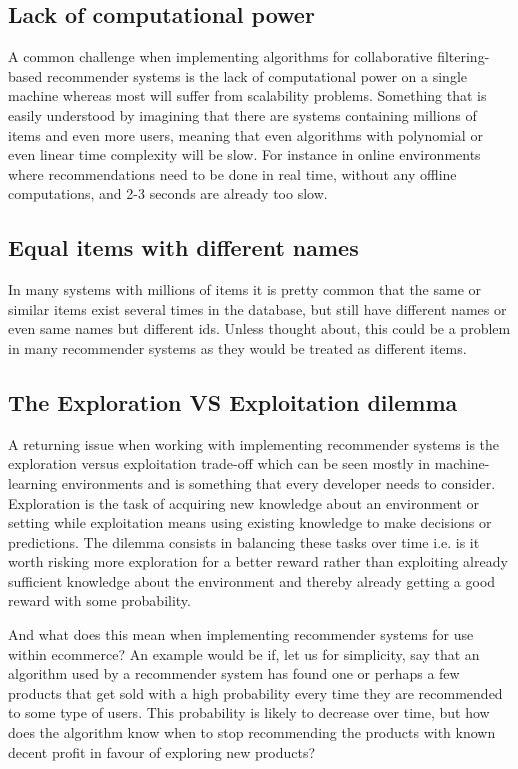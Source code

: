 \subsection{Lack of computational power}
A common challenge when implementing algorithms for collaborative filtering-based recommender systems is the lack of computational power on a single machine whereas most will suffer from scalability problems. Something that is easily understood by imagining that there are systems containing millions of items and even more users, meaning that even algorithms with polynomial or even linear time complexity will be slow. For instance in online environments where recommendations need to be done in real time, without any offline computations, and 2-3 seconds are already too slow.

\subsection{Equal items with different names}
In many systems with millions of items it is pretty common that the same or similar items exist several times in the database, but still have different names or even same names but different ids. Unless thought about, this could be a problem in many recommender systems as they would be treated as different items.

\subsection{The Exploration VS Exploitation dilemma}
A returning issue when working with implementing recommender systems is the exploration versus exploitation trade-off which can be seen mostly in machine-learning environments and is something that every developer needs to consider. Exploration is the task of acquiring new knowledge about an environment or setting while exploitation means using existing knowledge to make decisions or predictions. The dilemma consists in balancing these tasks over time i.e. is it worth risking more exploration for a better reward rather than exploiting already sufficient knowledge about the environment and thereby already getting a good reward with some probability.

And what does this mean when implementing recommender systems for use within ecommerce? An example would be if, let us for simplicity, say that an algorithm used by a recommender system has found one or perhaps a few products that get sold with a high probability every time they are recommended to some type of users. This probability is likely to decrease over time, but how does the algorithm know when to stop recommending the products with known decent profit in favour of exploring new products?

